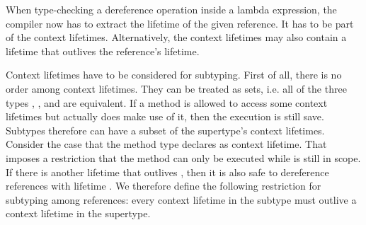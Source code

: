 When type-checking a dereference operation inside a lambda expression, the compiler now has to extract the lifetime of the given reference.
It has to be part of the context lifetimes.
Alternatively, the context lifetimes may also contain a lifetime that outlives the reference's lifetime.

Context lifetimes have to be considered for subtyping.
First of all, there is no order among context lifetimes.
They can be treated as sets, i.e. all of the three types , , and  are equivalent.
If a method is allowed to access some context lifetimes but actually does make use of it, then the execution is still save.
Subtypes therefore can have a subset of the supertype's context lifetimes.
Consider the case that the method type declares  as context lifetime.
That imposes a restriction that the method can only be executed while  is still in scope.
If there is another lifetime  that outlives , then it is also safe to dereference references with lifetime  .
We therefore define the following restriction for subtyping among references:
every context lifetime in the subtype must outlive a context lifetime in the supertype.
